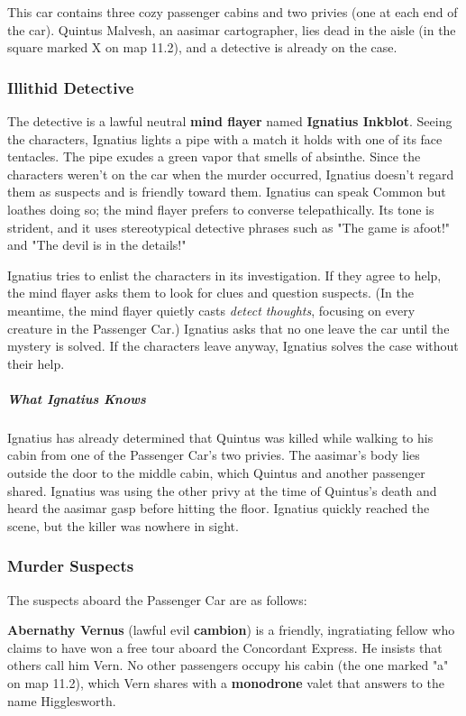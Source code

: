 \documentclass[10pt,a4paper,twoside,bg=print,twocolumn,openany,nodeprecatedcode]{dndarticle}
\begin{document}
This car contains three cozy passenger cabins and two privies (one at each end of the car). Quintus Malvesh, an aasimar cartographer, lies dead in the aisle (in the square marked X on map 11.2), and a detective is already on the case.

\subsubsection{Illithid Detective}
The detective is a lawful neutral \textbf{mind flayer} named \textbf{Ignatius Inkblot}. Seeing the characters, Ignatius lights a pipe with a match it holds with one of its face tentacles. The pipe exudes a green vapor that smells of absinthe. Since the characters weren't on the car when the murder occurred, Ignatius doesn't regard them as suspects and is friendly toward them. Ignatius can speak Common but loathes doing so; the mind flayer prefers to converse telepathically. Its tone is strident, and it uses stereotypical detective phrases such as "The game is afoot!" and "The devil is in the details!"

Ignatius tries to enlist the characters in its investigation. If they agree to help, the mind flayer asks them to look for clues and question suspects. (In the meantime, the mind flayer quietly casts \textit{detect thoughts}, focusing on every creature in the Passenger Car.) Ignatius asks that no one leave the car until the mystery is solved. If the characters leave anyway, Ignatius solves the case without their help.

\subparagraph{What Ignatius Knows}
Ignatius has already determined that Quintus was killed while walking to his cabin from one of the Passenger Car's two privies. The aasimar's body lies outside the door to the middle cabin, which Quintus and another passenger shared. Ignatius was using the other privy at the time of Quintus's death and heard the aasimar gasp before hitting the floor. Ignatius quickly reached the scene, but the killer was nowhere in sight.

\subsubsection{Murder Suspects}
The suspects aboard the Passenger Car are as follows:

\textbf{Abernathy Vernus} (lawful evil \textbf{cambion}) is a friendly, ingratiating fellow who claims to have won a free tour aboard the Concordant Express. He insists that others call him Vern. No other passengers occupy his cabin (the one marked "a" on map 11.2), which Vern shares with a \textbf{monodrone} valet that answers to the name Higglesworth.
\end{document}
